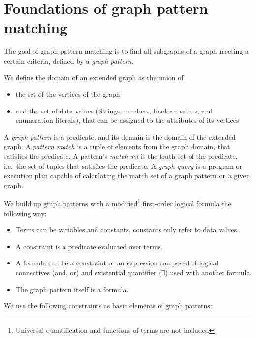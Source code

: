 \section{Foundations of graph pattern matching}
\label{section:gpmc}


The goal of graph pattern matching is to find all subgraphs of a graph meeting a certain criteria, defined by a \emph{graph pattern}.

We define the domain of an extended graph as the union of 
\begin{itemize}
	\item the set of the vertices of the graph
	\item and the set of data values (Strings, numbers, boolean values, and enumeration literals), that can be assigned to the attributes of its vertices
\end{itemize}

A \emph{graph pattern} is a predicate, and its  domain is the domain of the extended graph.
A \emph{pattern match} is a tuple of elements from the graph domain, that satisfies the predicate.
A pattern's \emph{match set} is the truth set of the predicate, i.e.\ the set of tuples that satisfies the predicate.
A \emph{graph query} is a program or execution plan capable of calculating the match set of a graph pattern on a given graph. 



We build up graph patterns with a modified\footnote{ Universal quantification and functions of terms are not included } first-order logical formula the following way:
\begin{itemize}
	\item Terms can be variables and constants, constants only refer to data values.
	\item A constraint is a predicate evaluated over terms. 
	\item A formula can be a constraint or an expression composed of logical connectives (and, or) and existential quantifier ($\exists{}$) used with another formula.
	\item The graph pattern itself is a formula.
\end{itemize}

We use the following constraints as basic elements of graph patterns:

